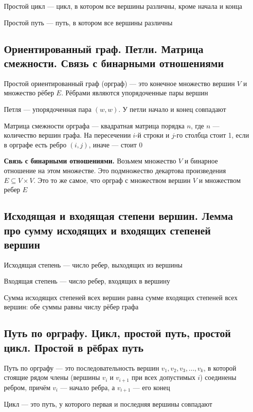\documentclass[a4paper]{article}
\begin{document}
 Простой цикл — цикл, в котором все вершины различны, кроме начала и конца

 Простой путь — путь, в котором все вершины различны

\subsection{Ориентированный граф. Петли. Матрица смежности. Связь с бинарными отношениями}
 Простой ориентированный граф (орграф) — это конечное множество вершин $V$ и множество рёбер $E$. Рёбрами являются упорядоченные пары вершин

 Петля — упорядоченная пара $(w, w)$. У петли начало и конец совпадают

 Матрица смежности орграфа — квадратная матрица порядка $n$, где $n$ — количество вершин графа. На пересечении $i$-й строки  и $j$-го столбца стоит 1, если в орграфе есть ребро $(i, j)$, иначе — стоит 0

\textbf{Связь с бинарными отношениями.} Возьмем множество $V$ и бинарное отношение на этом множестве. Это подмножество декартова произведения $E\subseteq V\times V$. Это то же самое, что орграф с множеством вершин $V$ и множеством ребер $E$


\subsection{Исходящая и входящая степени вершин. Лемма про сумму исходящих и входящих степеней вершин}
 Исходящая степень — число ребер, выходящих из вершины

 Входящая степень — число ребер, входящих в вершину

\lemma Сумма исходящих степеней всех вершин равна сумме входящих степеней всех вершин: обе суммы равны числу рёбер графа


\subsection{Путь по орграфу. Цикл, простой путь, простой цикл. Простой в рёбрах путь}
 Путь по орграфу — это  последовательность вершин $v_1, v_2, v_3,\ldots, v_k$, в которой стоящие рядом члены (вершины $v_i$ и $v_{i+1}$ при всех допустимых $i$) соединены ребром, причём $v_i$ — начало ребра, а $v_{i+1}$ — его конец

 Цикл — это путь, у которого первая и последняя вершины совпадают
\end{document}
